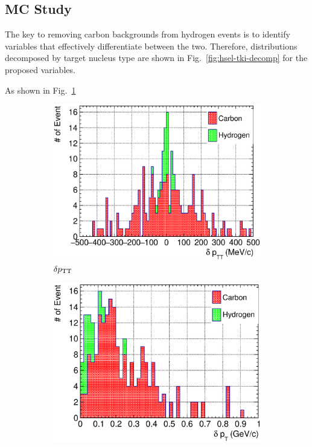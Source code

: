 \subsection{MC Study}
\label{sec:mc-hydrogen-ana}
     The key to removing carbon backgrounds from hydrogen events is to identify variables that effectively differentiate between the two.
     Therefore, distributions decomposed by target nucleus type are shown in Fig.~\ref{fig:hsel-tki-decomp} for the proposed variables.

     As shown in Fig.~\ref{subfig:hsel-dptt-stack}
     \begin{figure}
     \begin{subfigure}[b]{\dbfigwid\textwidth}
          \centering
          \includegraphics[width=\textwidth]{figures/perf/tki/SFGpTPCmu_dptt_stack_al15.eps}
          \caption{$\delta p_\textrm{TT}$}
          \label{subfig:hsel-dptt-stack}
     \end{subfigure}
     \begin{subfigure}[b]{\dbfigwid\textwidth}
          \centering
          \includegraphics[width=\textwidth]{figures/perf/tki/SFGpTPCmu_dpt_stack_al15.eps}

\end{subfigure}
\end{figure}
